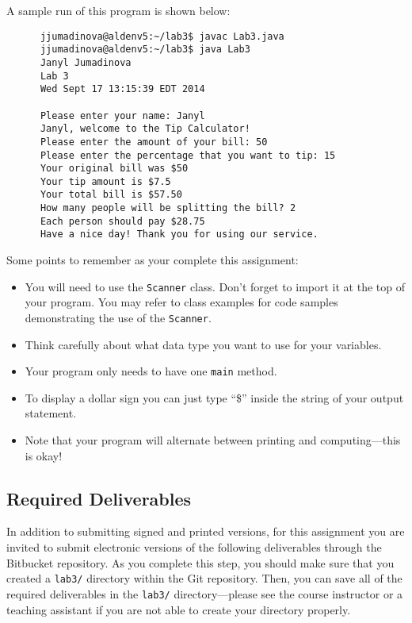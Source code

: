 \noindent
A sample run of this program is shown below:
\begin{verbatim}
      jjumadinova@aldenv5:~/lab3$ javac Lab3.java
      jjumadinova@aldenv5:~/lab3$ java Lab3
      Janyl Jumadinova
      Lab 3
      Wed Sept 17 13:15:39 EDT 2014

      Please enter your name: Janyl
      Janyl, welcome to the Tip Calculator!
      Please enter the amount of your bill: 50
      Please enter the percentage that you want to tip: 15
      Your original bill was $50
      Your tip amount is $7.5
      Your total bill is $57.50
      How many people will be splitting the bill? 2
      Each person should pay $28.75
      Have a nice day! Thank you for using our service.

\end{verbatim}
\vspace{-0.2in}
Some points to remember as your complete this assignment:
\begin{itemize}
\item You will need to use the {\tt Scanner} class. Don't forget to import it at the top of your program. You may refer to
  class examples for code samples demonstrating the use of the {\tt Scanner}.
\item Think carefully about what data type you want to use for your variables.
\item Your program only needs to have one {\tt main} method.
\item To display a dollar sign you can just type ``\$'' inside the string of your output statement.
\item Note that your program will alternate between printing and computing---this
is okay!
\end{itemize}

\vspace{-0.2in}
\subsection*{Required Deliverables}

In addition to submitting signed and printed versions, for this assignment you are invited to submit electronic versions
of the following deliverables through the Bitbucket repository. As you complete this step, you should make sure that you
created a {\tt lab3/} directory within the Git repository.  Then, you can save all of the required deliverables in the
{\tt lab3/} directory---please see the course instructor or a teaching assistant if you are not able to create your
directory properly.


